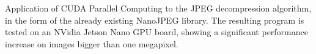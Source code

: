 \documentclass[%
	corpo=11pt,
    twoside,
    stile=classica,
    oldstyle,
    tipotesi=custom,
    greek,
    evenboxes,
]{toptesi}
\begin{document}
\english




\sommario%
Application of CUDA Parallel Computing to the JPEG decompression algorithm, in the form of the already existing NanoJPEG library. The resulting program is tested on an NVidia Jetson Nano GPU board, showing a significant performance increase on images bigger than one megapixel.




\tablespagetrue\figurespagetrue%

\indici%


    


\mainmatter











\appendix
\end{document}
